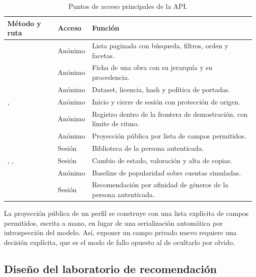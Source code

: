 \begin{table}[H]
\centering
\begin{tabularx}{\textwidth}{ | Y | Y | Y | }
    \hline
    \textbf{Método y ruta} & \textbf{Acceso} & \textbf{Función} \\
    \hline
     & Anónimo & Lista paginada con búsqueda, filtros, orden y facetas. \\
    \hline
     & Anónimo & Ficha de una obra con su jerarquía y su procedencia. \\
    \hline
     & Anónimo & Dataset, licencia, hash y política de portadas. \\
    \hline
    ,  & Anónimo & Inicio y cierre de sesión con protección de origen. \\
    \hline
     & Anónimo & Registro dentro de la frontera de demostración, con límite de ritmo. \\
    \hline
     & Anónimo & Proyección pública por lista de campos permitidos. \\
    \hline
     & Sesión & Biblioteca de la persona autenticada. \\
    \hline
    , ,  & Sesión & Cambio de estado, valoración y alta de copias. \\
    \hline
     & Anónimo & Baseline de popularidad sobre cuentas simuladas. \\
    \hline
     & Sesión & Recomendación por afinidad de géneros de la persona autenticada. \\
    \hline
\end{tabularx}
\caption{Puntos de acceso principales de la API.}
\label{tab:endpoints}
\end{table}

La proyección pública de un perfil se construye con una lista explícita de campos permitidos,
escrita a mano, en lugar de una serialización automática por introspección del modelo. Así,
exponer un campo privado nuevo requiere una decisión explícita, que es el modo de fallo
opuesto al de ocultarlo por olvido.

\subsection{Diseño del laboratorio de recomendación}

